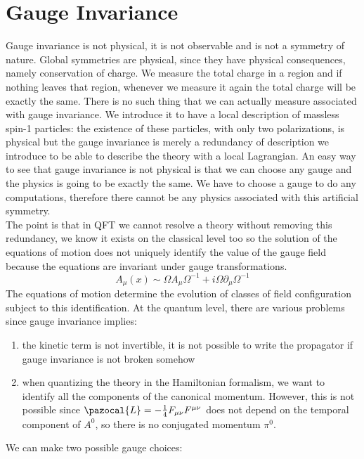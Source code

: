 \documentclass[../main.tex]{subfiles}
\begin{document}
\section{Gauge Invariance}
Gauge invariance is not physical, it is not observable and is not a symmetry of nature. Global symmetries are physical, since they have physical consequences, namely conservation of charge. We measure the total charge in a region and if nothing leaves that region, whenever we measure it again the total charge will be exactly the same. There is no such thing that we can actually measure associated with gauge invariance. We introduce it to have a local description of massless spin-1 particles: the existence of these particles, with only two polarizations, is physical but the gauge invariance is merely a redundancy of description we introduce to be able to describe the theory with a local Lagrangian. An easy way to see that gauge invariance is not physical is that we can choose any gauge and the physics is going to be exactly the same. We have to choose a gauge to do any computations, therefore there cannot be any physics associated with this artificial symmetry.\\
The point is that in QFT we cannot resolve a theory without removing this redundancy, we know it exists on the classical level too so the solution of the equations of motion does not uniquely identify the value of the gauge field because the equations are invariant under gauge transformations.
\[
A_\mu(x)\sim\Omega A_\mu\Omega^{-1}+i\Omega\partial_\mu\Omega^{-1}
\]
The equations of motion determine the evolution of classes of field configuration subject to this identification. At the quantum level, there are various problems since gauge invariance implies:
\begin{enumerate}
    \item the kinetic term is not invertible, it is not possible to write the propagator if gauge invariance is not broken somehow
    \item when quantizing the theory in the Hamiltonian formalism, we want to identify all the components of the canonical momentum. However, this is not possible since $\pazocal{L}=-\frac{1}{4}F_{\mu\nu}F^{\mu\nu}$ does not depend on the temporal component of $A^0$, so there is no conjugated momentum $\pi^0$.
\end{enumerate}
We can make two possible gauge choices:
\end{document}
